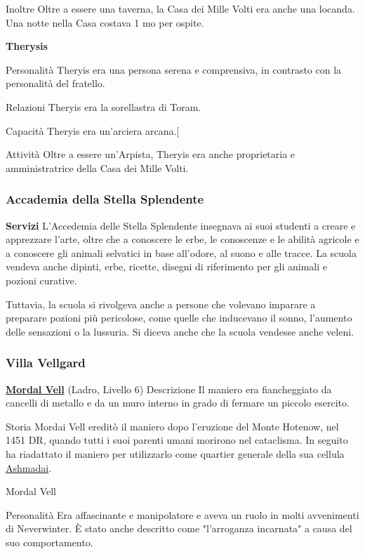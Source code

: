 \documentclass{article}
\begin{document}
Inoltre
Oltre a essere una taverna, la Casa dei Mille Volti era anche una locanda. Una notte nella Casa costava 1 mo per ospite.

\hypertarget{ther}{\textbf{Therysis}}
Personalità
Theryis era una persona serena e comprensiva, in contrasto con la personalità del fratello.

Relazioni
Theryis era la sorellastra di Toram.

Capacità
Theryis era un'arciera arcana.[

Attività
Oltre a essere un'Arpista, Theryis era anche proprietaria e amministratrice della Casa dei Mille Volti.

              \subsubsection{Accademia della Stella Splendente}
\textbf{Servizi}
L'Accedemia delle Stella Splendente insegnava ai suoi studenti a creare e apprezzare l'arte, oltre che a conoscere le erbe, le conoscenze e le abilità agricole e a conoscere gli animali selvatici in base all'odore, al suono e alle tracce. La scuola vendeva anche dipinti, erbe, ricette, disegni di riferimento per gli animali e pozioni curative.

Tuttavia, la scuola si rivolgeva anche a persone che volevano imparare a preparare pozioni più pericolose, come quelle che inducevano il sonno, l'aumento delle sensazioni o la lussuria. Si diceva anche che la scuola vendesse anche veleni.

              \subsubsection{Villa Vellgard}
\hyperlink{mor}{\textbf{Mordal Vell}} (Ladro, Livello 6)
Descrizione
Il maniero era fiancheggiato da cancelli di metallo e da un muro interno in grado di fermare un piccolo esercito.

Storia
Mordai Vell ereditò il maniero dopo l'eruzione del Monte Hotenow, nel 1451 DR, quando tutti i suoi parenti umani morirono nel cataclisma. In seguito ha riadattato il maniero per utilizzarlo come quartier generale della sua cellula \hyperlink{ash}{Ashmadai}.\newline

\hypertarget{mor}{Mordal Vell}
Personalità
Era affascinante e manipolatore e aveva un ruolo in molti avvenimenti di Neverwinter. È stato anche descritto come "l'arroganza incarnata" a causa del suo comportamento.
\end{document}
